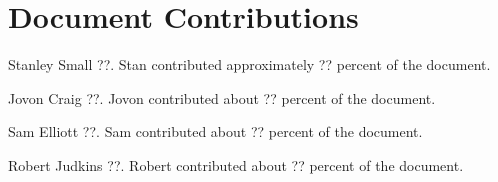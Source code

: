 \documentclass{article}
\begin{document}
\newpage
\section{Document Contributions}

Stanley Small ??. Stan contributed approximately ?? percent of the document.

Jovon Craig ??. Jovon contributed about ?? percent of the document.

Sam Elliott ??. Sam contributed about ?? percent of the document.

Robert Judkins ??. Robert contributed about ?? percent of the document.
\end{document}
